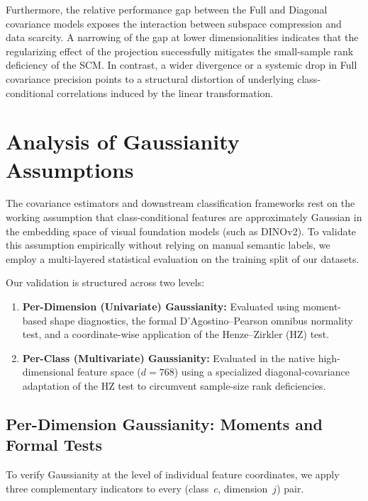 Furthermore, the relative performance gap between the Full and Diagonal covariance models exposes the interaction between subspace compression and data scarcity. A narrowing of the gap at lower dimensionalities indicates that the regularizing effect of the projection successfully mitigates the small-sample rank deficiency of the SCM. In contrast, a wider divergence or a systemic drop in Full covariance precision points to a structural distortion of underlying class-conditional correlations induced by the linear transformation.

\section{Analysis of Gaussianity Assumptions}
\label{sec:method:gaussianity_main}

The covariance estimators and downstream classification frameworks rest on the working assumption that class-conditional features are approximately Gaussian in the embedding space of visual foundation models (such as DINOv2). To validate this assumption empirically without relying on manual semantic labels, we employ a multi-layered statistical evaluation on the training split of our datasets. 

Our validation is structured across two levels:
\begin{enumerate}
	\item \textbf{Per-Dimension (Univariate) Gaussianity:} Evaluated using moment-based shape diagnostics, the formal D'Agostino--Pearson omnibus normality test, and a coordinate-wise application of the Henze--Zirkler (HZ) test.
	\item \textbf{Per-Class (Multivariate) Gaussianity:} Evaluated in the native high-dimensional feature space ($d=768$) using a specialized diagonal-covariance adaptation of the HZ test to circumvent sample-size rank deficiencies.
\end{enumerate}


\subsection{Per-Dimension Gaussianity: Moments and Formal Tests}
\label{sec:method:gaussianity:moments}
\label{sec:method:gaussianity:normaltest}

To verify Gaussianity at the level of individual feature coordinates, we apply three complementary indicators to every (class~$c$, dimension~$j$) pair.

